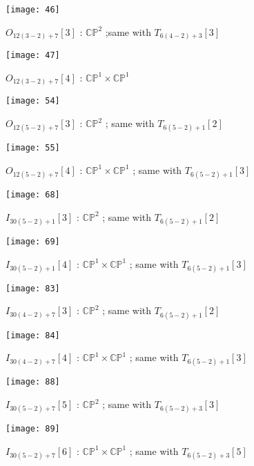 \documentclass[reqno, twoside, a4paper]{amsart}
\theoremstyle{definition}
\numberwithin{equation}{section}
\begin{document}
\begin{figure}[H]
  \centering
  \texttt{[image: 46]}
  \caption{$O_{12(3-2)+7}[3]$ : $\mathbb{CP}^2$ ;same with $T_{6(4-2)+3}[3]$}
\end{figure}

\begin{figure}[H]
  \centering
  \texttt{[image: 47]}
  \caption{$O_{12(3-2)+7}[4]$ : $\mathbb{CP}^1 \times \mathbb{CP}^1$}
\end{figure}

\begin{figure}[H]
  \centering
  \texttt{[image: 54]}
  \caption{$O_{12(5-2)+7}[3]$ : $\mathbb{CP}^2$ ; same with $T_{6(5-2)+1}[2]$}
\end{figure}

\begin{figure}[H]
  \centering
  \texttt{[image: 55]}
  \caption{$O_{12(5-2)+7}[4]$ : $\mathbb{CP}^1 \times \mathbb{CP}^1$ ; same with $T_{6(5-2)+1}[3]$}
\end{figure}

\begin{figure}[H]
  \centering
  \texttt{[image: 68]}
  \caption{$I_{30(5-2)+1}[3]$ : $\mathbb{CP}^2$ ; same with $T_{6(5-2)+1}[2]$}
\end{figure}

\begin{figure}[H]
  \centering
  \texttt{[image: 69]}
  \caption{$I_{30(5-2)+1}[4]$ : $\mathbb{CP}^1 \times \mathbb{CP}^1$ ; same with $T_{6(5-2)+1}[3]$}
\end{figure}

\begin{figure}[H]
  \centering
  \texttt{[image: 83]}
  \caption{$I_{30(4-2)+7}[3]$ : $\mathbb{CP}^2$ ; same with $T_{6(5-2)+1}[2]$}
\end{figure}

\begin{figure}[H]
  \centering
  \texttt{[image: 84]}
  \caption{$I_{30(4-2)+7}[4]$ : $\mathbb{CP}^1 \times \mathbb{CP}^1$ ; same with $T_{6(5-2)+1}[3]$}
\end{figure}

\begin{figure}[H]
  \centering
  \texttt{[image: 88]}
  \caption{$I_{30(5-2)+7}[5]$ : $\mathbb{CP}^2$ ; same with $T_{6(5-2)+3}[3]$}
\end{figure}

\begin{figure}[H]
  \centering
  \texttt{[image: 89]}
  \caption{$I_{30(5-2)+7}[6]$ : $\mathbb{CP}^1 \times \mathbb{CP}^1$ ; same with $T_{6(5-2)+3}[5]$}
\end{figure}
\end{document}
